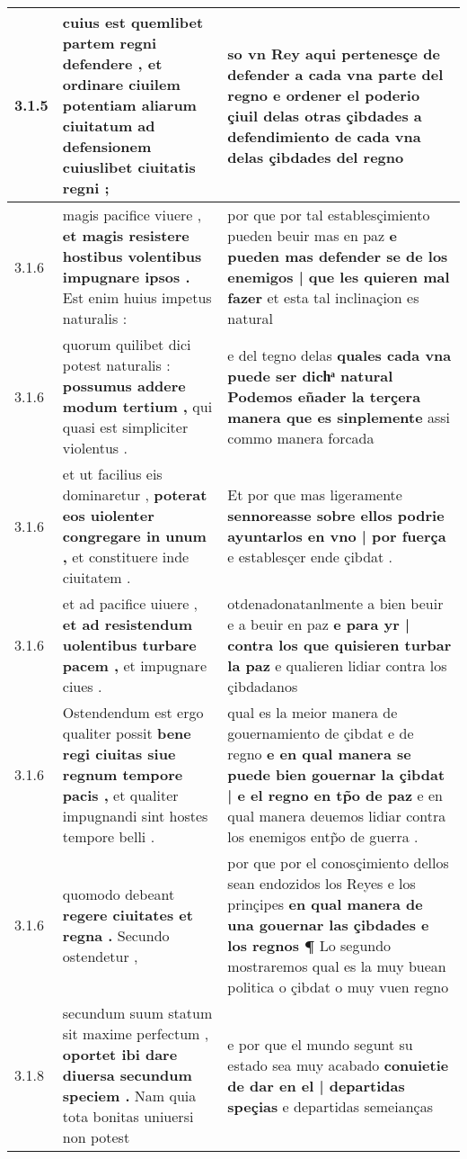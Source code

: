 \begin{tabular}{|p{1cm}|p{6.5cm}|p{6.5cm}|}
3.1.5 & cuius est quemlibet partem regni defendere , \textbf{ et ordinare ciuilem potentiam aliarum ciuitatum } ad defensionem cuiuslibet ciuitatis regni ; & so vn Rey aqui pertenesçe de defender a cada vna parte del regno \textbf{ e ordener el poderio çiuil delas otras çibdades } a defendimiento de cada vna delas çibdades del regno \\\hline
3.1.6 & magis pacifice viuere , \textbf{ et magis resistere hostibus volentibus impugnare ipsos . } Est enim huius impetus naturalis : & por que por tal establesçimiento pueden beuir mas en paz \textbf{ e pueden mas defender se de los enemigos | que les quieren mal fazer } et esta tal inclinaçion es natural \\\hline
3.1.6 & quorum quilibet dici potest naturalis : \textbf{ possumus addere modum tertium , } qui quasi est simpliciter violentus . & e del tegno delas \textbf{ quales cada vna puede ser dichͣ natural Podemos eñader la terçera manera que es sinplemente } assi commo manera forcada \\\hline
3.1.6 & et ut facilius eis dominaretur , \textbf{ poterat eos uiolenter congregare in unum , } et constituere inde ciuitatem . & Et por que mas ligeramente \textbf{ sennoreasse sobre ellos podrie ayuntarlos en vno | por fuerça } e establesçer ende çibdat . \\\hline
3.1.6 & et ad pacifice uiuere , \textbf{ et ad resistendum uolentibus turbare pacem , } et impugnare ciues . & otdenadonatanlmente a bien beuir e a beuir en paz \textbf{ e para yr | contra los que quisieren turbar la paz } e qualieren lidiar contra los çibdadanos \\\hline
3.1.6 & Ostendendum est ergo qualiter possit \textbf{ bene regi ciuitas siue regnum tempore pacis , } et qualiter impugnandi sint hostes tempore belli . & qual es la meior manera de gouernamiento de çibdat e de regno \textbf{ e en qual manera se puede bien gouernar la çibdat | e el regno en tp̃o de paz } e en qual manera deuemos lidiar contra los enemigos entp̃o de guerra . \\\hline
3.1.6 & quomodo debeant \textbf{ regere ciuitates et regna . } Secundo ostendetur , & por que por el conosçimiento dellos sean endozidos los Reyes e los prinçipes \textbf{ en qual manera de una gouernar las çibdades e los regnos ¶ } Lo segundo mostraremos qual es la muy buean politica o çibdat o muy vuen regno \\\hline
3.1.8 & secundum suum statum sit maxime perfectum , \textbf{ oportet ibi dare diuersa secundum speciem . } Nam quia tota bonitas uniuersi non potest & e por que el mundo segunt su estado sea muy acabado \textbf{ conuietie de dar en el | departidas speçias } e departidas semeianças \\\hline

\end{tabular}
